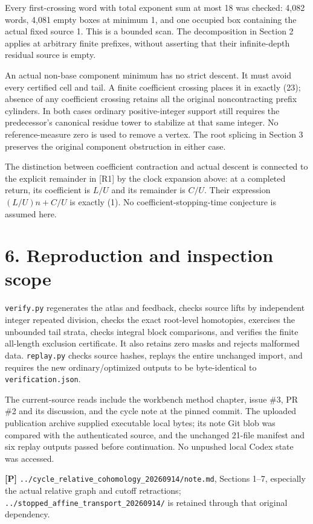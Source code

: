 Every first-crossing word with total exponent sum at most 18 was
checked: 4,082 words, 4,081 empty boxes at minimum 1, and one occupied
box containing the actual fixed source 1. This is a bounded scan. The
decomposition in Section 2 applies at arbitrary finite prefixes, without
asserting that their infinite-depth residual source is empty.

An actual non-base component minimum has no strict descent. It must
avoid every certified cell and tail. A finite coefficient crossing
places it in exactly (23); absence of any coefficient crossing retains
all the original noncontracting prefix cylinders. In both cases ordinary
positive-integer support still requires the predecessor's canonical
residue tower to stabilize at that same integer. No reference-measure
zero is used to remove a vertex. The root splicing in Section 3
preserves the original component obstruction in either case.

The distinction between coefficient contraction and actual descent is
connected to the explicit remainder in {[}R1{]} by the clock expansion
above: at a completed return, its coefficient is \(L/U\) and its
remainder is \(C/U\). Their expression \((L/U)n+C/U\) is exactly (1). No
coefficient-stopping-time conjecture is assumed here.

\section{6. Reproduction and inspection scope}

\nolinkurl{verify.py} regenerates the atlas and feedback, checks source
lifts by independent integer repeated division, checks the exact
root-level homotopies, exercises the unbounded tail strata, checks
integral block comparisons, and verifies the finite all-length exclusion
certificate. It also retains zero masks and rejects malformed data.
\nolinkurl{replay.py} checks source hashes, replays the entire unchanged
import, and requires the new ordinary/optimized outputs to be
byte-identical to \nolinkurl{verification.json}.

The current-source reads include the workbench method chapter, issue
\#3, PR \#2 and its discussion, and the cycle note at the pinned commit.
The uploaded publication archive supplied executable local bytes; its
note Git blob was compared with the authenticated source, and the
unchanged 21-file manifest and six replay outputs passed before
continuation. No unpushed local Codex state was accessed.

\textbf{{[}P{]}}
\nolinkurl{../cycle_relative_cohomology_20260914/note.md}, Sections
1--7, especially the actual relative graph and cutoff retractions;
\nolinkurl{../stopped_affine_transport_20260914/} is retained through
that original dependency.


